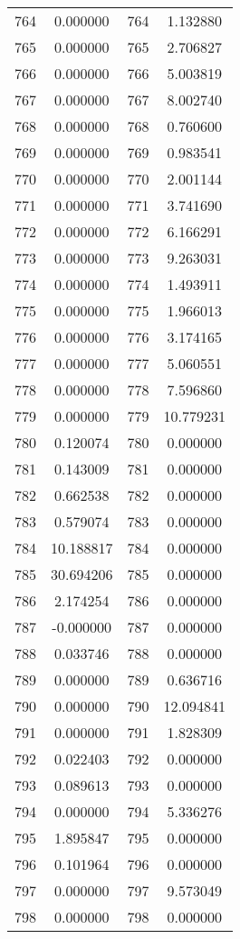\documentclass[12pt]{article}
\begin{document}
\begin{longtable}{@{}cccc@{}}
764 & 0.000000 & 764 & 1.132880 \\
765 & 0.000000 & 765 & 2.706827 \\
766 & 0.000000 & 766 & 5.003819 \\
767 & 0.000000 & 767 & 8.002740 \\
768 & 0.000000 & 768 & 0.760600 \\
769 & 0.000000 & 769 & 0.983541 \\
770 & 0.000000 & 770 & 2.001144 \\
771 & 0.000000 & 771 & 3.741690 \\
772 & 0.000000 & 772 & 6.166291 \\
773 & 0.000000 & 773 & 9.263031 \\
774 & 0.000000 & 774 & 1.493911 \\
775 & 0.000000 & 775 & 1.966013 \\
776 & 0.000000 & 776 & 3.174165 \\
777 & 0.000000 & 777 & 5.060551 \\
778 & 0.000000 & 778 & 7.596860 \\
779 & 0.000000 & 779 & 10.779231 \\
780 & 0.120074 & 780 & 0.000000 \\
781 & 0.143009 & 781 & 0.000000 \\
782 & 0.662538 & 782 & 0.000000 \\
783 & 0.579074 & 783 & 0.000000 \\
784 & 10.188817 & 784 & 0.000000 \\
785 & 30.694206 & 785 & 0.000000 \\
786 & 2.174254 & 786 & 0.000000 \\
787 & -0.000000 & 787 & 0.000000 \\
788 & 0.033746 & 788 & 0.000000 \\
789 & 0.000000 & 789 & 0.636716 \\
790 & 0.000000 & 790 & 12.094841 \\
791 & 0.000000 & 791 & 1.828309 \\
792 & 0.022403 & 792 & 0.000000 \\
793 & 0.089613 & 793 & 0.000000 \\
794 & 0.000000 & 794 & 5.336276 \\
795 & 1.895847 & 795 & 0.000000 \\
796 & 0.101964 & 796 & 0.000000 \\
797 & 0.000000 & 797 & 9.573049 \\
798 & 0.000000 & 798 & 0.000000 \\

\end{longtable}
\end{document}
